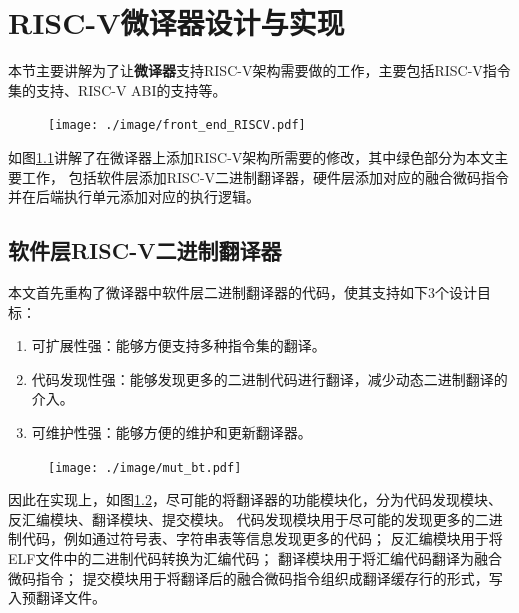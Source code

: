 \chapter{RISC-V微译器设计与实现}\label{chap:RISC-V}

本节主要讲解为了让\textbf{微译器}支持RISC-V架构需要做的工作，主要包括RISC-V指令集的支持、RISC-V ABI的支持等。

\begin{figure}[!htbp]
  \centering
  \texttt{[image: ./image/front\_end\_RISCV.pdf]}
  \label{img:front_end_riscv}
\end{figure}

如图\ref{img:front_end_riscv}讲解了在微译器上添加RISC-V架构所需要的修改，其中绿色部分为本文主要工作，
包括软件层添加RISC-V二进制翻译器，硬件层添加对应的融合微码指令并在后端执行单元添加对应的执行逻辑。

\section{软件层RISC-V二进制翻译器}

本文首先重构了微译器中软件层二进制翻译器的代码，使其支持如下3个设计目标：
\begin{enumerate}
  \item 可扩展性强：能够方便支持多种指令集的翻译。
  \item 代码发现性强：能够发现更多的二进制代码进行翻译，减少动态二进制翻译的介入。
  \item 可维护性强：能够方便的维护和更新翻译器。
\end{enumerate}

\begin{figure}[!htbp]
  \centering
  \texttt{[image: ./image/mut\_bt.pdf]}
  \label{img:mut_bt}
\end{figure}

因此在实现上，如图\ref{img:mut_bt}，尽可能的将翻译器的功能模块化，分为代码发现模块、反汇编模块、翻译模块、提交模块。
代码发现模块用于尽可能的发现更多的二进制代码，例如通过符号表、字符串表等信息发现更多的代码；
反汇编模块用于将ELF文件中的二进制代码转换为汇编代码；
翻译模块用于将汇编代码翻译为融合微码指令；
提交模块用于将翻译后的融合微码指令组织成翻译缓存行的形式，写入预翻译文件。

